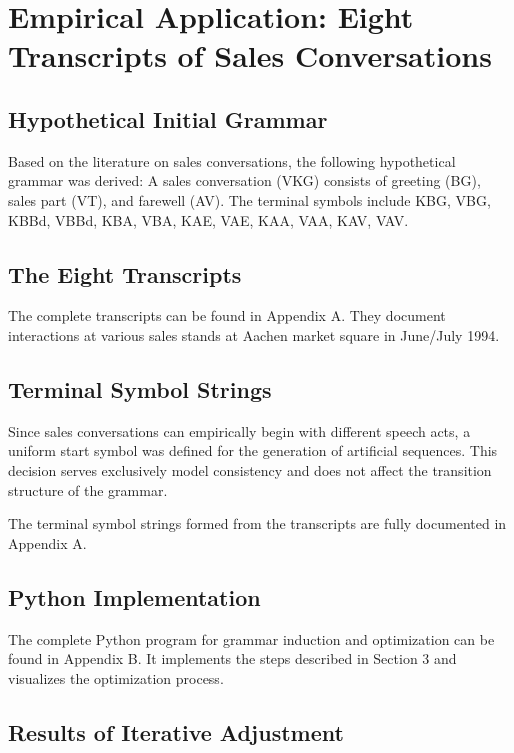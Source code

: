 \documentclass[
  12pt,
  a4paper,
  oneside,
  titlepage
]{article}
\begin{document}
\section{Empirical Application: Eight Transcripts of Sales Conversations}

\subsection{Hypothetical Initial Grammar}

Based on the literature on sales conversations, the following hypothetical grammar 
was derived: A sales conversation (VKG) consists of greeting (BG), sales part (VT), 
and farewell (AV). The terminal symbols include KBG, VBG, KBBd, VBBd, KBA, VBA, KAE, 
VAE, KAA, VAA, KAV, VAV.

\subsection{The Eight Transcripts}

The complete transcripts can be found in Appendix A. They document interactions at 
various sales stands at Aachen market square in June/July 1994.

\subsection{Terminal Symbol Strings}

Since sales conversations can empirically begin with different speech acts, a uniform 
start symbol was defined for the generation of artificial sequences. This decision 
serves exclusively model consistency and does not affect the transition structure of 
the grammar.

The terminal symbol strings formed from the transcripts are fully documented in 
Appendix A.

\subsection{Python Implementation}

The complete Python program for grammar induction and optimization can be found in 
Appendix B. It implements the steps described in Section 3 and visualizes the 
optimization process.

\subsection{Results of Iterative Adjustment}
\end{document}
